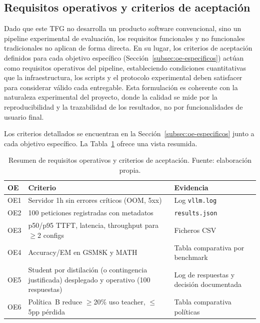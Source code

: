 \subsection{Requisitos operativos y criterios de aceptación}

Dado que este TFG no desarrolla un producto software convencional, sino un pipeline experimental de evaluación, los requisitos funcionales y no funcionales tradicionales no aplican de forma directa. En su lugar, los criterios de aceptación definidos para cada objetivo específico (Sección~\ref{subsec:oe-especificos}) actúan como requisitos operativos del pipeline, estableciendo condiciones cuantitativas que la infraestructura, los scripts y el protocolo experimental deben satisfacer para considerar válido cada entregable. Esta formulación es coherente con la naturaleza experimental del proyecto, donde la calidad se mide por la reproducibilidad y la trazabilidad de los resultados, no por funcionalidades de usuario final.

Los criterios detallados se encuentran en la Sección~\ref{subsec:oe-especificos} junto a cada objetivo específico. La Tabla~\ref{tab:acceptance} ofrece una vista resumida.

\begin{table}[H]
\centering
\caption{Resumen de requisitos operativos y criterios de aceptación. Fuente: elaboración propia.}
\label{tab:acceptance}
\footnotesize
\setlength{\tabcolsep}{4pt}
\begin{tabularx}{\textwidth}{>{\raggedright\arraybackslash}p{1cm} X >{\raggedright\arraybackslash}p{4.5cm}}
\toprule
\textbf{OE} & \textbf{Criterio} & \textbf{Evidencia} \\
\midrule
OE1 & Servidor 1h sin errores críticos (OOM, 5xx) & Log \texttt{vllm.log} \\
OE2 & 100 peticiones registradas con metadatos & \texttt{results.json} \\
OE3 & p50/p95 TTFT, latencia, throughput para $\geq$2 configs & Ficheros CSV \\
OE4 & Accuracy/EM en GSM8K y MATH & Tabla comparativa por benchmark \\
OE5 & Student por distilación (o contingencia justificada) desplegado y operativo (100 respuestas) & Log de respuestas y decisión documentada \\
OE6 & Política~B reduce $\geq$20\% uso teacher, $\leq$5pp pérdida & Tabla comparativa políticas \\
\bottomrule
\end{tabularx}
\end{table}

